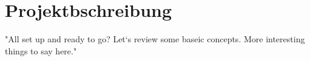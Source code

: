 \section{Projektbschreibung}

"All set up and ready to go? Let`s review some baseic concepts.
More interesting things to say here." \cite*{testbuch1}